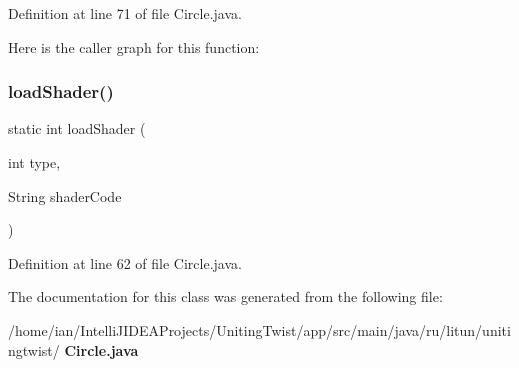 Definition at line 71 of file Circle.\+java.

Here is the caller graph for this function\+:
\mbox{\label{classsf_1_1unitingtwist_1_1_circle_a711436305cb76f8d625468db4d0cb41d}} 
\subsubsection{load\+Shader()}
{\footnotesize\ttfamily static int load\+Shader (\begin{DoxyParamCaption}\item[{int}]{type,  }\item[{String}]{shader\+Code }\end{DoxyParamCaption})\hspace{0.3cm}{\ttfamily [static]}}



Definition at line 62 of file Circle.\+java.



The documentation for this class was generated from the following file\+:\begin{DoxyCompactItemize}
\item 
/home/ian/\+Intelli\+J\+I\+D\+E\+A\+Projects/\+Uniting\+Twist/app/src/main/java/ru/litun/unitingtwist/\textbf{ Circle.\+java}\end{DoxyCompactItemize}
